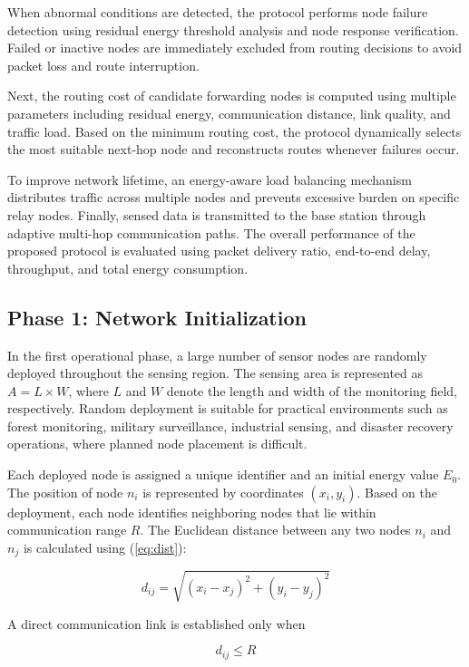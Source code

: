 \documentclass[a4paper,fleqn]{cas-dc}
\numberwithin{equation}{section}
\begin{document}
When abnormal conditions are detected, the protocol performs node failure detection using residual energy threshold analysis and node response verification. Failed or inactive nodes are immediately excluded from routing decisions to avoid packet loss and route interruption.

Next, the routing cost of candidate forwarding nodes is computed using multiple parameters including residual energy, communication distance, link quality, and traffic load. Based on the minimum routing cost, the protocol dynamically selects the most suitable next-hop node and reconstructs routes whenever failures occur.

To improve network lifetime, an energy-aware load balancing mechanism distributes traffic across multiple nodes and prevents excessive burden on specific relay nodes. Finally, sensed data is transmitted to the base station through adaptive multi-hop communication paths. The overall performance of the proposed protocol is evaluated using packet delivery ratio, end-to-end delay, throughput, and total energy consumption.
\subsection{Phase 1: Network Initialization}

In the first operational phase, a large number of sensor nodes are randomly deployed throughout the sensing region. The sensing area is represented as $A=L \times W$, where $L$ and $W$ denote the length and width of the monitoring field, respectively. Random deployment is suitable for practical environments such as forest monitoring, military surveillance, industrial sensing, and disaster recovery operations, where planned node placement is difficult.

Each deployed node is assigned a unique identifier and an initial energy value $E_0$. The position of node $n_i$ is represented by coordinates $(x_i,y_i)$. Based on the deployment, each node identifies neighboring nodes that lie within communication range $R$. The Euclidean distance between any two nodes $n_i$ and $n_j$ is calculated using (\ref{eq:dist}):

\begin{equation}
d_{ij}=\sqrt{(x_i-x_j)^2+(y_i-y_j)^2}
\end{equation}

A direct communication link is established only when

\begin{equation}
d_{ij}\leq R
\end{equation}
\end{document}
